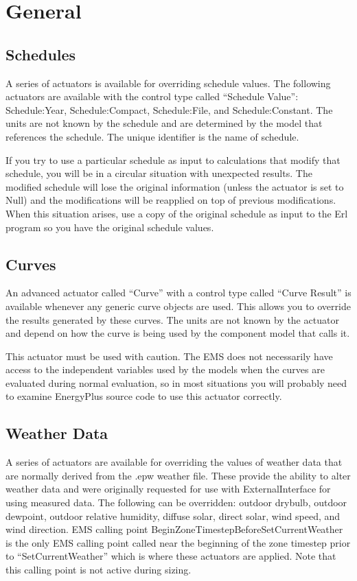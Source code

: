 \section{General}\label{general}

\subsection{Schedules}\label{schedules}

A series of actuators is available for overriding schedule values. The following actuators are available with the control type called ``Schedule Value'':~ Schedule:Year, Schedule:Compact, Schedule:File, and Schedule:Constant. The units are not known by the schedule and are determined by the model that references the schedule. The unique identifier is the name of schedule.

If you try to use a particular schedule as input to calculations that modify that schedule, you will be in a circular situation with unexpected results. The modified schedule will lose the original information (unless the actuator is set to Null) and the modifications will be reapplied on top of previous modifications. When this situation arises, use a copy of the original schedule as input to the Erl program so you have the original schedule values.

\subsection{Curves}\label{curves}

An advanced actuator called ``Curve'' with a control type called ``Curve Result'' is available whenever any generic curve objects are used. This allows you to override the results generated by these curves. The units are not known by the actuator and depend on how the curve is being used by the component model that calls it.

This actuator must be used with caution. The EMS does not necessarily have access to the independent variables used by the models when the curves are evaluated during normal evaluation, so in most situations you will probably need to examine EnergyPlus source code to use this actuator correctly.

\subsection{Weather Data}\label{weather-data}

A series of actuators are available for overriding the values of weather data that are normally derived from the .epw weather file. These provide the ability to alter weather data and were originally requested for use with ExternalInterface for using measured data. The following can be overridden: outdoor drybulb, outdoor dewpoint, outdoor relative humidity, diffuse solar, direct solar, wind speed, and wind direction. EMS calling point BeginZoneTimestepBeforeSetCurrentWeather is the only EMS calling point called near the beginning of the zone timestep prior to ``SetCurrentWeather'' which is where these actuators are applied. Note that this calling point is not active during sizing.
